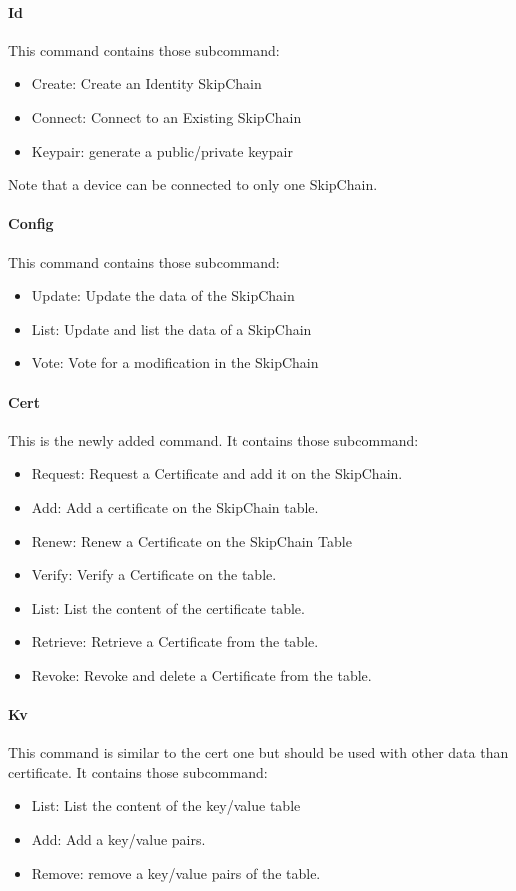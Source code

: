 \documentclass[11pt, a4paper, twoside, openright]{article}
\begin{document}
\paragraph{Id}
This command contains those subcommand:
\begin{itemize}
\item Create: Create an Identity SkipChain
\item Connect: Connect to an Existing SkipChain
\item Keypair: generate a public/private keypair  
\end{itemize}
Note that a device can be connected to only one SkipChain.
\paragraph{Config}
This command contains those subcommand:
\begin{itemize}
\item Update: Update the data of the SkipChain 
\item List: Update and list the data of a SkipChain
\item Vote: Vote for a modification in the SkipChain
\end{itemize}
\paragraph{Cert}
This is the newly added command. It contains those subcommand:
\begin{itemize}
\item Request: Request a Certificate and add it on the SkipChain.
\item Add: Add a certificate on the SkipChain table.
\item Renew: Renew a Certificate on the SkipChain Table
\item Verify: Verify a Certificate on the table.
\item List: List the content of the certificate table.
\item Retrieve: Retrieve a Certificate from the table.
\item Revoke: Revoke and delete a Certificate from the table.
\end{itemize}
\paragraph{Kv}
This command is similar to the cert one but should be used with other data than certificate. It contains those subcommand:  
\begin{itemize}
\item List: List the content of the key/value table
\item Add: Add a key/value pairs.
\item Remove: remove a key/value pairs of the table.
\end{itemize}
\end{document}

